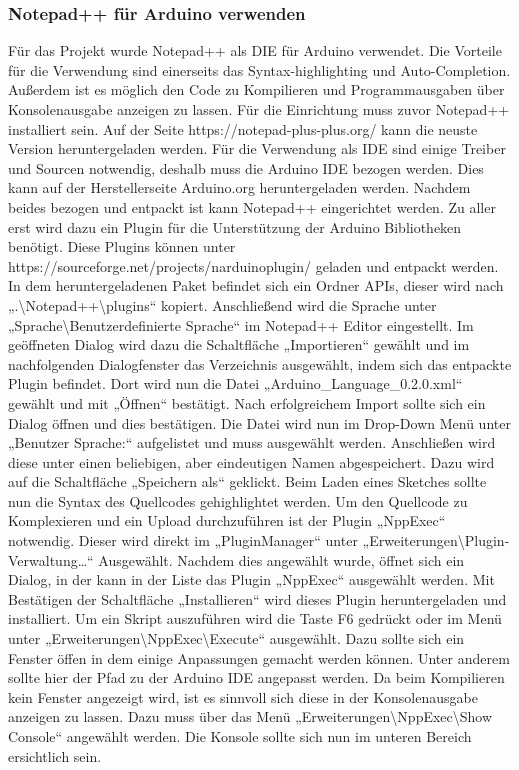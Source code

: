 \subsubsection {Notepad++ für Arduino verwenden}
Für das Projekt wurde Notepad++ als DIE für Arduino verwendet. Die Vorteile für die Verwendung sind einerseits das Syntax-highlighting und Auto-Completion. Außerdem ist es möglich den Code zu Kompilieren und Programmausgaben über Konsolenausgabe anzeigen zu lassen.
Für die Einrichtung muss zuvor Notepad++ installiert sein. Auf der Seite https://notepad-plus-plus.org/ kann die neuste Version heruntergeladen werden.  Für die Verwendung als IDE sind einige Treiber und Sourcen notwendig, deshalb muss die Arduino IDE bezogen werden. Dies kann auf der Herstellerseite Arduino.org heruntergeladen werden. Nachdem beides bezogen und entpackt ist kann Notepad++ eingerichtet werden. Zu aller erst wird dazu ein Plugin für die Unterstützung der Arduino Bibliotheken benötigt. Diese Plugins können unter https://sourceforge.net/projects/narduinoplugin/ geladen und entpackt werden. In dem heruntergeladenen Paket befindet sich ein Ordner APIs, dieser wird nach „.\textbackslash{}Notepad++\textbackslash{}plugins“ kopiert. Anschließend wird die Sprache unter „Sprache\textbackslash{}Benutzerdefinierte Sprache“ im Notepad++ Editor eingestellt. Im geöffneten Dialog wird dazu die Schaltfläche „Importieren“ gewählt und im nachfolgenden Dialogfenster das Verzeichnis ausgewählt, indem sich das entpackte Plugin befindet. Dort wird nun die Datei „Arduino\_Language\_0.2.0.xml“ gewählt und mit „Öffnen“ bestätigt. Nach erfolgreichem Import sollte sich ein Dialog öffnen und dies bestätigen. Die Datei wird nun im Drop-Down Menü unter „Benutzer Sprache:“ aufgelistet und muss ausgewählt werden. Anschließen wird diese unter einen beliebigen, aber eindeutigen Namen abgespeichert. Dazu wird auf die Schaltfläche „Speichern als“ geklickt. Beim Laden eines Sketches sollte nun die Syntax des Quellcodes gehighlightet werden.
Um den Quellcode zu Komplexieren und ein Upload durchzuführen ist der Plugin „NppExec“ notwendig. Dieser wird direkt im „PluginManager“ unter „Erweiterungen\textbackslash{}Plugin-Verwaltung…“ Ausgewählt. Nachdem dies angewählt wurde, öffnet sich ein Dialog, in der kann in der Liste das Plugin „NppExec“ ausgewählt werden. Mit Bestätigen der Schaltfläche „Installieren“ wird dieses Plugin heruntergeladen und installiert. Um ein Skript auszuführen wird die Taste F6 gedrückt oder im Menü unter „Erweiterungen\textbackslash{}NppExec\textbackslash{}Execute“ ausgewählt. Dazu sollte sich ein Fenster öffen in dem einige Anpassungen gemacht werden können. Unter anderem sollte hier der Pfad zu der Arduino IDE angepasst werden. Da beim Kompilieren kein Fenster angezeigt wird, ist es sinnvoll sich diese in der Konsolenausgabe anzeigen zu lassen. Dazu muss über das Menü „Erweiterungen\textbackslash{}NppExec\textbackslash{}Show Console“ angewählt werden. Die Konsole sollte sich nun im unteren Bereich ersichtlich sein.

